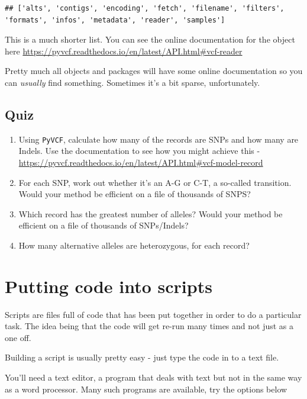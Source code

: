 \documentclass[]{book}
\providecommand{\tightlist}{%
  \setlength{\itemsep}{0pt}\setlength{\parskip}{0pt}}
\theoremstyle{definition}
\theoremstyle{definition}
\theoremstyle{definition}
\theoremstyle{remark}
\begin{document}
\begin{verbatim}
## ['alts', 'contigs', 'encoding', 'fetch', 'filename', 'filters', 'formats', 'infos', 'metadata', 'reader', 'samples']
\end{verbatim}

This is a much shorter list. You can see the online documentation for
the object here
\href{}{https://pyvcf.readthedocs.io/en/latest/API.html\#vcf-reader}

Pretty much all objects and packages will have some online documentation
so you can \emph{usually} find something. Sometimes it's a bit sparse,
unfortunately.

\hypertarget{quiz-5}{%
\section{Quiz}\label{quiz-5}}

\begin{enumerate}
\def\labelenumi{\arabic{enumi}.}
\tightlist
\item
  Using \texttt{PyVCF}, calculate how many of the records are SNPs and
  how many are Indels. Use the documentation to see how you might
  achieve this -
  \href{}{https://pyvcf.readthedocs.io/en/latest/API.html\#vcf-model-record}
\item
  For each SNP, work out whether it's an A-G or C-T, a so-called
  transition. Would your method be efficient on a file of thousands of
  SNPS?
\item
  Which record has the greatest number of alleles? Would your method be
  efficient on a file of thousands of SNPs/Indels?
\item
  How many alternative alleles are heterozygous, for each record?
\end{enumerate}

\hypertarget{putting-code-into-scripts}{%
\chapter{Putting code into scripts}\label{putting-code-into-scripts}}

Scripts are files full of code that has been put together in order to do
a particular task. The idea being that the code will get re-run many
times and not just as a one off.

Building a script is usually pretty easy - just type the code in to a
text file.

You'll need a text editor, a program that deals with text but not in the
same way as a word processor. Many such programs are available, try the
options below
\end{document}
